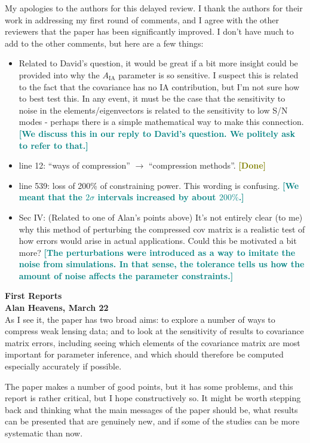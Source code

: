\documentclass{article}
\newcommand\reply[1]{{\bf {\textcolor{teal}{[#1]}}}}
\newcommand\done{{\bf {\textcolor{olive}{[Done]}}}}
\begin{document}
	My apologies to the authors for this delayed review. I thank the authors for their work in addressing my first round of comments, and I agree with the other reviewers that the paper has been significantly improved. I don't have much to add to the other comments, but here are a few things: 
	\begin{itemize}
		\item Related to David's question, it would be great if a bit more insight could be provided into why the $A_{\mathrm{IA}}$ parameter is so sensitive. I suspect this is related to the fact that the covariance has no IA contribution, but I'm not sure how to best test this. In any event, it must be the case that the sensitivity to noise in the elements/eigenvectors is related to the sensitivity to low S/N modes - perhaps there is a simple mathematical way to make this connection. \reply{We discuss this in our reply to David's question. We politely ask to refer to that.}
		\item line 12: “ways of compression” $\rightarrow$ “compression methods”. \done
		\item line 539: loss of 200\% of constraining power. This wording is confusing. \reply{We meant that the $2 \sigma$ intervals increased by about $200\%$.}
		\item Sec IV: (Related to one of Alan's points above) It's not entirely clear (to me) why this method of perturbing the compressed cov matrix is a realistic test of how errors would arise in actual applications. Could this be motivated a bit more? \reply{The perturbations were introduced as a way to imitate the noise from simulations. In that sense, the tolerance tells us how the amount of noise affects the parameter constraints.}
	\end{itemize}
	
	
	\pagebreak
	
	{\Large\textbf{First Reports}}\\
	
	\textbf{Alan Heavens, March 22} \\
	
	As I see it, the paper has two broad aims: to explore a number of ways to compress weak lensing data; and to look at the sensitivity of results to covariance matrix errors, including seeing which elements of the covariance matrix are most important for parameter inference, and which should therefore be computed especially accurately if possible.
	
	The paper makes a number of good points, but it has some problems, and this report is rather critical, but I hope constructively so.  It might be worth stepping back and thinking what the main messages of the paper should be, what results can be presented that are genuinely new, and if some of the studies can be more systematic than now.  \\
	
\end{document}
